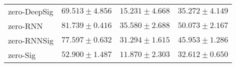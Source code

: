 \begin{tabular}{llll}
zero-DeepSig   &                           $ 69.513 \pm 4.856 $ &                           $ 15.231 \pm 4.668 $ &                           $ 35.272 \pm 4.149 $ \\
zero-RNN       &                           $ 81.739 \pm 0.416 $ &                           $ 35.580 \pm 2.688 $ &                           $ 50.073 \pm 2.167 $ \\
zero-RNNSig    &                           $ 77.597 \pm 0.632 $ &                           $ 31.294 \pm 1.615 $ &                           $ 45.953 \pm 1.286 $ \\
zero-Sig       &                           $ 52.900 \pm 1.487 $ &                           $ 11.870 \pm 2.303 $ &                           $ 32.612 \pm 0.650 $ \\
\bottomrule
\end{tabular}

